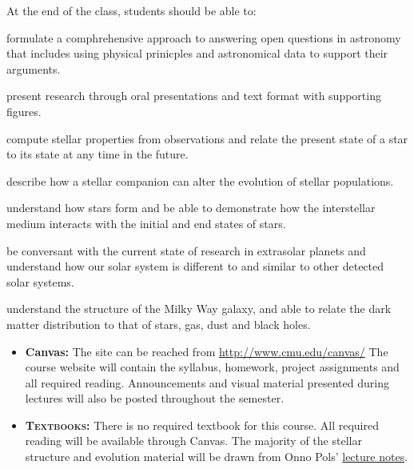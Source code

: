 \documentclass[11pt, a4paper]{article}
\begin{document}
\noindent At the end of the class, students should be able to:
\begin{borderedsquare}
     \setlength\itemsep{0.3em}        
	\item formulate a comphrehensive approach to answering open questions in
	astronomy that includes using physical prinicples and astronomical data to
	support their arguments.
	\item present research through oral presentations and text format with
	supporting figures.
    \item compute stellar properties from observations and relate the present
state of a star to its state at any time in the future.
    \item describe how a stellar companion can alter the evolution of stellar
    populations.
    \item understand how stars form and be able to demonstrate how the
interstellar medium interacts with the initial and end states of stars. 
    \item be conversant with the current state of research in extrasolar planets
and understand how our solar system is different to and similar to other
detected solar systems.
    \item understand the structure of the Milky Way galaxy, and able to relate
the dark matter distribution to that of stars, gas, dust and black holes.
\end{borderedsquare}

\begin{itemize}[itemsep=4pt,parsep=0pt,topsep=1pt,partopsep=1pt]
	\item[\color{darkblue}\faNewspaperO]\textbf{Canvas:} The site can be reached
	from \href{http://www.cmu.edu/canvas/}{http://www.cmu.edu/canvas/} The
	course website will contain the syllabus, homework, project assignments and
	all required reading. Announcements and visual material presented during
	lectures will also be posted throughout the semester.\\

	\item[\color{darkblue}\faBook] \textbf{\textsc{Textbooks:}} There is no
	required textbook for this course. All required reading will be available
	through Canvas. The majority of the stellar structure and evolution material
	will be drawn from Onno Pols'
	\href{https://www.astro.ru.nl/~onnop/education/stev_utrecht_notes/}{lecture
	notes}.
\end{itemize}
\end{document}

